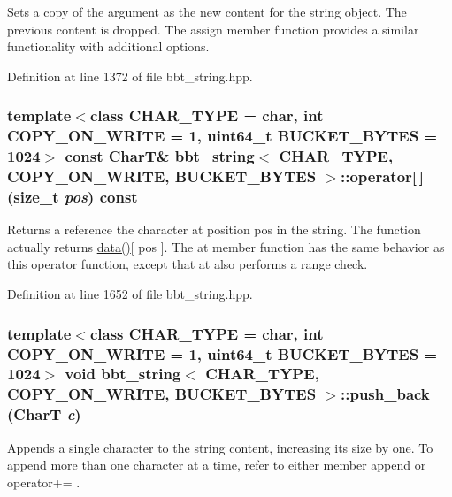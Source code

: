 Sets a copy of the argument as the new content for the string object. The previous content is dropped. The assign member function provides a similar functionality with additional options. 

Definition at line 1372 of file bbt\_\-string.hpp.\hypertarget{classbbt__string_40427f0c3552b431b087c9d4c0684f85}{
\subsubsection[{operator[]}]{\setlength{\rightskip}{0pt plus 5cm}template$<$class CHAR\_\-TYPE  = char, int COPY\_\-ON\_\-WRITE = 1, uint64\_\-t BUCKET\_\-BYTES = 1024$>$ const CharT\& {\bf bbt\_\-string}$<$ CHAR\_\-TYPE, COPY\_\-ON\_\-WRITE, BUCKET\_\-BYTES $>$::operator\mbox{[}$\,$\mbox{]} (size\_\-t {\em pos}) const}}
\label{classbbt__string_40427f0c3552b431b087c9d4c0684f85}


Returns a reference the character at position pos in the string. The function actually returns \hyperlink{classbbt__string_bd225f98ab68e2385b6d3e23bd4719cb}{data()}\mbox{[} pos \mbox{]}. The at member function has the same behavior as this operator function, except that at also performs a range check. 

Definition at line 1652 of file bbt\_\-string.hpp.\hypertarget{classbbt__string_a458692ed9ffa90e7634f36b3944bda2}{
\subsubsection[{push\_\-back}]{\setlength{\rightskip}{0pt plus 5cm}template$<$class CHAR\_\-TYPE  = char, int COPY\_\-ON\_\-WRITE = 1, uint64\_\-t BUCKET\_\-BYTES = 1024$>$ void {\bf bbt\_\-string}$<$ CHAR\_\-TYPE, COPY\_\-ON\_\-WRITE, BUCKET\_\-BYTES $>$::push\_\-back (CharT {\em c})}}
\label{classbbt__string_a458692ed9ffa90e7634f36b3944bda2}


Appends a single character to the string content, increasing its size by one. To append more than one character at a time, refer to either member append or operator+= . 

